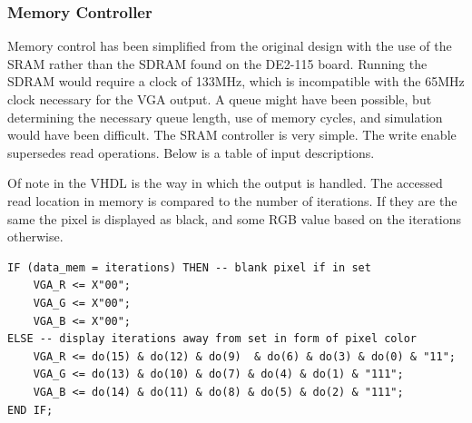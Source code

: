 \documentclass[titlepage]{article}      %
\begin{document}
\subsubsection{Memory Controller}
Memory control has been simplified from the original design with the use of the SRAM rather than the SDRAM found on the DE2-115 board. Running the SDRAM would require a clock of 133MHz, which is incompatible with the 65MHz clock necessary for the VGA output. A queue might have been possible, but determining the necessary queue length, use of memory cycles, and simulation would have been difficult. The SRAM controller is very simple. The write enable supersedes read operations. Below is a table of input descriptions.
\begin{table}[H]
\centering
{}
\caption{Inputs of the memory controller}
\end{table}
Of note in the VHDL is the way in which the output is handled. The accessed read location in memory is compared to the number of iterations. If they are the same the pixel is displayed as black, and some RGB value based on the iterations otherwise.
\begin{lstlisting}
IF (data_mem = iterations) THEN -- blank pixel if in set
	VGA_R <= X"00";
	VGA_G <= X"00";
	VGA_B <= X"00";
ELSE -- display iterations away from set in form of pixel color
	VGA_R <= do(15) & do(12) & do(9)  & do(6) & do(3) & do(0) & "11";
	VGA_G <= do(13) & do(10) & do(7) & do(4) & do(1) & "111";
	VGA_B <= do(14) & do(11) & do(8) & do(5) & do(2) & "111";
END IF;
\end{lstlisting}
\end{document}

